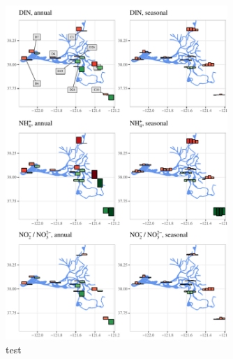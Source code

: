 \documentclass[letterpaper,12pt,oneside]{article}\usepackage[]{graphicx}\usepackage[]{color}
\begin{document}
\begin{figure}[!ht]

{\centering \includegraphics[width=0.75\textwidth]{figs/trndmap2-1} 

}

\caption[test]{test}\label{fig:trndmap2}
\end{figure}
\end{document}
